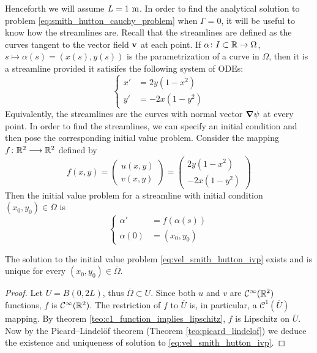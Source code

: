 Henceforth we will assume $L = 1 \ \meter$. In order to find the analytical
solution to problem \eqref{eq:smith_hutton_cauchy_problem} when $\Gamma = 0$, it
will be useful to know how the streamlines are. Recall that the streamlines are
defined as the curves tangent to the vector field $\vb{v}$ at each point. If
$\alpha \colon I \subset \mathbb{R} \to \Omega$, $s \mapsto \alpha(s) = (x(s), y(s))$
is the parametrization of a curve in $\Omega$, then it is a streamline provided
it satisifes the following system of ODEs:
\begin{equation} \label{eq:velocity_smith_hutton_odes}
	\left\{
	\begin{aligned}
		x' &= 2 y (1 - x^2) \\
		y' &= - 2 x (1 - y^2)
	\end{aligned}
	\right.
\end{equation}
Equivalently, the streamlines are the curves with normal vector $\grad{\psi}$ at
every point. In order to find the streamlines, we can specify an initial
condition and then pose the corresponding initial value problem. Consider the
mapping $f \colon \mathbb{R}^2 \longrightarrow \mathbb{R}^2$ defined by
\begin{equation*}
	f(x,y) = 
	\begin{pmatrix}
		u(x,y) \\ v(x,y)
	\end{pmatrix} =
	\begin{pmatrix}
		2 y (1 - x^2) \\ - 2 x (1 - y^2)
	\end{pmatrix}
\end{equation*}
Then the initial value problem for a streamline with initial condition $(x_0,y_0) \in \overline{\Omega}$ is
\begin{equation} \label{eq:vel_smith_hutton_ivp}
	\left\{
		\begin{aligned}
			\alpha' &= f(\alpha(s)) \\
			\alpha(0) &= (x_0, y_0)
		\end{aligned}
	\right.
\end{equation}

\begin{prop} \label{prop:existence_uniqueness_streamlines}
	The solution to the initial value problem \eqref{eq:vel_smith_hutton_ivp}
	exists and is unique for every $(x_0, y_0) \in \overline{\Omega}$.
\end{prop}
\begin{proof}
	Let $U = B(0,2L)$, thus $\overline{\Omega} \subset U$. Since both $u$ and
	$v$ are $\mathcal{C}^\infty(\mathbb{R}^2)$ functions, $f$ is
	$\mathcal{C}^\infty(\mathbb{R}^2)$. The restriction of $f$ to $\overline{U}$ is,
	in particular, a $\mathcal{C}^1(\overline{U})$ mapping. By theorem
	\ref{teo:c1_function_implies_lipschitz}, $f$ is Lipschitz on $\overline{U}$.
	Now by the Picard--Lindelöf theorem (Theorem \ref{teo:picard_lindelof}) we
	deduce the existence and uniqueness of solution to
	\eqref{eq:vel_smith_hutton_ivp}.
\end{proof}


